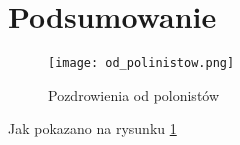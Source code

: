 \newpage %
\section{Podsumowanie} 
\lipsum[1-3]

\begin{figure}[!ht]
	\centering 
	\texttt{[image: od\_polinistow.png]}
	\caption{Pozdrowienia od polonistów}\label{fig:polonistyka1}
\end{figure}

Jak pokazano na rysunku \ref{fig:polonistyka1}